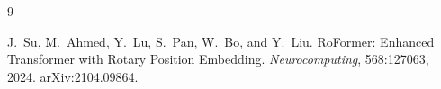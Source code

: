\documentclass[11pt, a4paper]{article}
\begin{document}
\begin{thebibliography}{9}

J.~Su, M.~Ahmed, Y.~Lu, S.~Pan, W.~Bo, and Y.~Liu.
\newblock RoFormer: Enhanced Transformer with Rotary Position Embedding.
\newblock \emph{Neurocomputing}, 568:127063, 2024.
\newblock arXiv:2104.09864.

\end{thebibliography}
\end{document}
